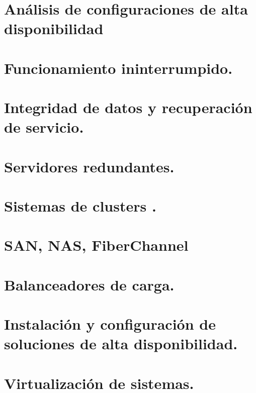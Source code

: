 \documentclass[letterpaper,10pt,spanish]{sphinxmanual}
\begin{document}
\section{Análisis de configuraciones de alta disponibilidad}
\label{\detokenize{tema_sad/tema_sad:analisis-de-configuraciones-de-alta-disponibilidad}}

\section{Funcionamiento ininterrumpido.}
\label{\detokenize{tema_sad/tema_sad:funcionamiento-ininterrumpido}}

\section{Integridad de datos y recuperación de servicio.}
\label{\detokenize{tema_sad/tema_sad:integridad-de-datos-y-recuperacion-de-servicio}}

\section{Servidores redundantes.}
\label{\detokenize{tema_sad/tema_sad:servidores-redundantes}}

\section{Sistemas de  clusters .}
\label{\detokenize{tema_sad/tema_sad:sistemas-de-clusters}}

\section{SAN, NAS, FiberChannel}
\label{\detokenize{tema_sad/tema_sad:san-nas-fiberchannel}}

\section{Balanceadores de carga.}
\label{\detokenize{tema_sad/tema_sad:balanceadores-de-carga}}

\section{Instalación y configuración de soluciones de alta disponibilidad.}
\label{\detokenize{tema_sad/tema_sad:instalacion-y-configuracion-de-soluciones-de-alta-disponibilidad}}

\section{Virtualización de sistemas.}
\label{\detokenize{tema_sad/tema_sad:virtualizacion-de-sistemas}}
\end{document}
